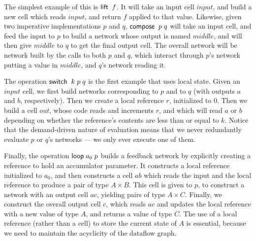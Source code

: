 The simplest example of this is $\mathsf{lift}\;\;f$. It will take an input
cell $input$, and build a new cell which reads $input$, and return $f$
applied to that value. Likewise, given two imperative implementations $p$
and $q$, $\mathsf{compose}\;\;p\;q$ will take an input cell, and feed the
input to $p$ to build a network whose output is named $middle$, and
will then give $middle$ to $q$ to get the final output cell. The
overall network will be network built by the calls to both $p$ and
$q$, which interact through $p$'s network putting a value in $middle$,
and $q$'s network reading it.

The operation $\mathsf{switch}\;\;k\;p\;q$ is the first example that uses 
local state. Given an $input$ cell, we first build networks corresponding
to $p$ and to $q$ (with outputs $a$ and $b$, respectively). Then we
create a local reference $r$, initialized to $0$. Then we build a cell $out$,
whose code reads and increments $r$, and which will read $a$ or $b$ depending
on whether the reference's contents are less than or equal to $k$. Notice
that the demand-driven nature of evaluation means that we never redundantly
evaluate $p$ or $q$'s networks --- we only ever execute one of them. 

Finally, the operation $\mathsf{loop}\; a_0\;p$ builds a feedback network by
explicitly creating a reference to hold an accumulator parameter. It
constructs a local reference initialized to $a_0$, and then constructs
a cell $ab$ which reads the input and the local reference to produce a
pair of type $A \times B$. This cell is given to $p$, to construct a
network with an output cell $ac$, yielding pairs of type $A \times
C$. Finally, we construct the overall output cell $c$, which reads
$ac$ and updates the local reference with a new value of type $A$, and
returns a value of type $C$. The use of a local reference (rather than
a cell) to store the current state of $A$ is essential, because we need
to maintain the acyclicity of the dataflow graph. 

